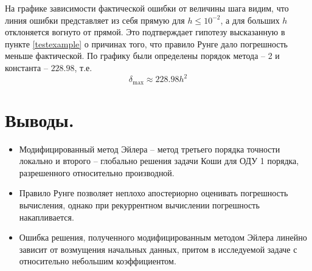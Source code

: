\documentclass[a4paper, 12pt]{article}
\begin{document}
	На графике зависимости фактической ошибки от величины шага видим, что линия ошибки представляет из себя прямую для $h\leq10^{-2}$, а для больших $h$ отклоняется вогнуто от прямой. Это подтверждает гипотезу высказанную в пункте \ref{testexample} о причинах того, что правило Рунге дало погрешность меньше фактической. По графику были определены порядок метода -- 2 и константа -- $228.98$, т.е.
	\begin{equation}
		\delta_{\text{max}}\approx228.98h^2
	\end{equation}
	
	\section{Выводы.}
	
	\begin{itemize}
		\item Модифицированный метод Эйлера -- метод третьего порядка точности локально и второго -- глобально решения задачи Коши для ОДУ 1 порядка, разрешенного относительно производной.
		\item Правило Рунге позволяет неплохо апостериорно оценивать погрешность вычисления, однако при рекуррентном вычислении погрешность накапливается.
		\item Ошибка решения, полученного модифицированным методом Эйлера линейно зависит от возмущения начальных данных, притом в исследуемой задаче с относительно небольшим коэффициентом. 
	\end{itemize}
	
\end{document}
